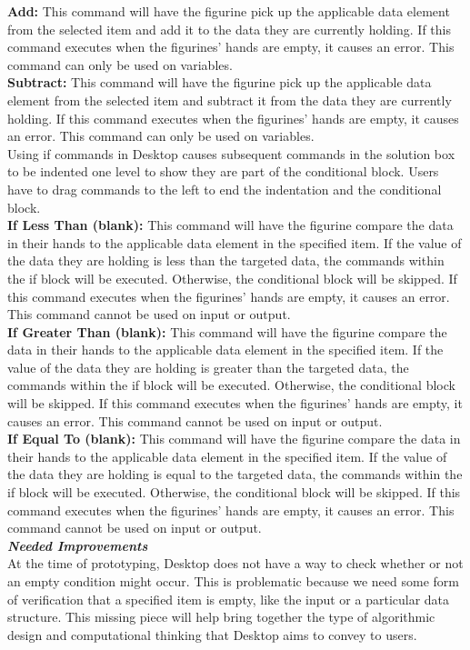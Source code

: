 \textbf{Add:}
This command will have the figurine pick up the applicable data element from the selected item and add it to the data they 
are currently holding. If this command executes when the figurines’ hands are empty, it causes an error. This command 
can only be used on variables.\\

\textbf{Subtract:}
This command will have the figurine pick up the applicable data element from the selected item and subtract it from the 
data they are currently holding. If this command executes when the figurines’ hands are empty, it causes an error. This 
command can only be used on variables.\\

Using if commands in Desktop causes subsequent commands in the solution box to be indented one level to show 
they are part of the conditional block. Users have to drag commands to the left to end the indentation and the conditional 
block.\\

\textbf{If Less Than (blank):}
This command will have the figurine compare the data in their hands to the applicable data element in the specified item. 
If the value of the data they are holding is less than the targeted data, the commands within the if block will be executed. 
Otherwise, the conditional block will be skipped. If this command executes when the figurines’ hands are empty, it causes 
an error. This command cannot be used on input or output.\\

\textbf{If Greater Than (blank):}
This command will have the figurine compare the data in their hands to the applicable data element in the specified item. If 
the value of the data they are holding is greater than the targeted data, the commands within the if block will be executed. 
Otherwise, the conditional block will be skipped. If this command executes when the figurines’ hands are empty, it causes 
an error. This command cannot be used on input or output.\\

\textbf{If Equal To (blank):}
This command will have the figurine compare the data in their hands to the applicable data element in the specified item. If 
the value of the data they are holding is equal to the targeted data, the commands within the if block will be executed. 
Otherwise, the conditional block will be skipped. If this command executes when the figurines’ hands are empty, it causes 
an error. This command cannot be used on input or output.\\

\textbf{\textit{Needed Improvements}}\\
At the time of prototyping, Desktop does not have a way to check whether or not an empty condition might occur. This 
is problematic because we need some form of verification that a specified item is empty, like the input or a particular data 
structure. This missing piece will help bring together the type of algorithmic design and computational thinking that Desktop 
aims to convey to users.\\

\newpage